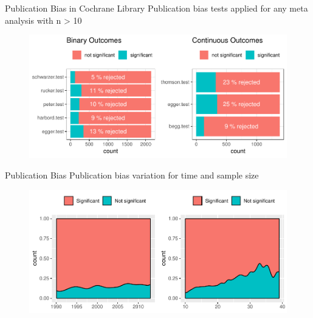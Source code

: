 \documentclass[english]{beamer}\usepackage[]{graphicx}\usepackage[]{color}
\makeatletter
\def\maxwidth{ %
  \ifdim\Gin@nat@width>\linewidth
    \linewidth
  \else
    \Gin@nat@width
  \fi
}
\newenvironment{knitrout}{}{} %
\makeatother
\begin{document}
\begin{frame}{Publication Bias in Cochrane Library}
Publication bias tests applied for any meta analysis with n > 10

\vspace{-1.7cm}
\begin{figure}[fragile]
\begin{knitrout}
\color{fgcolor}
\includegraphics[width=\maxwidth]{figure/unnamed-chunk-5-1} 

\end{knitrout}
\end{figure}
\end{frame}

\begin{frame}{Publication Bias}
Publication bias variation for time and sample size
\begin{figure}
\begin{knitrout}
\color{fgcolor}
\includegraphics[width=\maxwidth]{figure/unnamed-chunk-6-1} 

\end{knitrout}
\end{figure}
\end{frame}
\end{document}
